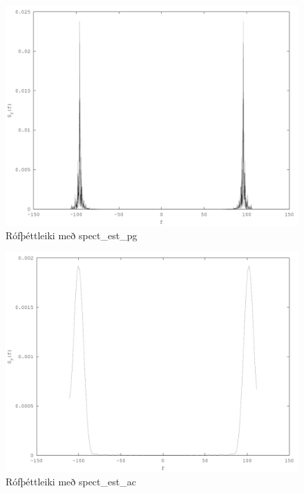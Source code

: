 \documentclass[11pt,a4paper]{article}
\begin{document}
\begin{figure}[htbp]
    \begin{center}
        \includegraphics[scale=0.5]{fig3.pdf}
    \end{center}
    \caption{Rófþéttleiki með spect\_est\_pg}
    \label{fig:pg}
\end{figure}
\begin{figure}[htbp]
    \begin{center}
        \includegraphics[scale=0.5]{fig4.pdf}
    \end{center}
    \caption{Rófþéttleiki með spect\_est\_ac}
    \label{fig:ac}
\end{figure}
\end{document}
